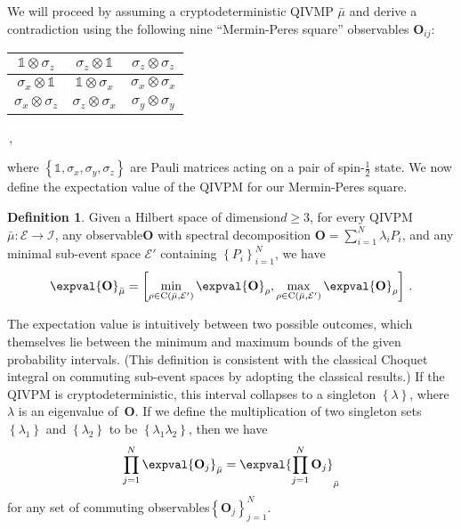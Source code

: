 \documentclass[english,reprint, aps, prl,superscriptaddress, showpacs,
showkeys, longbibliography, amsmath, amssymb]{revtex4-1}
\theoremstyle{plain}
\theoremstyle{definition}
\newtheorem{definition}[thm]{Definition}
\newcommand{\events}{\ensuremath{\mathcal{E}}}
\newcommand{\coreBorn}{\ensuremath{\mathrm{C}}}
\newcommand{\nb}{\nolinebreak[1] }
\begin{document}
We will proceed by assuming a cryptodeterministic QIVMP $\bar{\mu}$
and derive a contradiction using the following nine ``Mermin-Peres square''
observables $\mathbf{O}_{ij}$\nb\cite{Mermin1990Simple,peres1995quantum}:
\begin{center}
\begin{tabular}{|c|c|c|}
\hline 
$\mathbb{1}\otimes\sigma_{z}$  & $\sigma_{z}\otimes\mathbb{1}$  & $\sigma_{z}\otimes\sigma_{z}$ \tabularnewline
\hline 
$\sigma_{x}\otimes\mathbb{1}$  & $\mathbb{1}\otimes\sigma_{x}$  & $\sigma_{x}\otimes\sigma_{x}$ \tabularnewline
\hline 
$\sigma_{x}\otimes\sigma_{z}$  & $\sigma_{z}\otimes\sigma_{x}$  & $\sigma_{y}\otimes\sigma_{y}$ \tabularnewline
\hline 
\end{tabular}\,,
\par\end{center}

\noindent where $\left\{\mathbb{1},\sigma_{x},\sigma_{y},\sigma_{z}\right\}$ are
Pauli matrices acting on a pair of spin-$\frac{1}{2}$ state. We now define the
expectation value of the QIVPM for our Mermin-Peres square.

\begin{definition}Given a Hilbert space of dimension\nb$d\ge3$, for every
  QIVPM\nb$\bar{\mu}:\events\rightarrow\mathscr{I}$, any
  observable\nb$\mathbf{O}$ with spectral decomposition
  $\mathbf{O}=\sum_{i=1}^{N}\lambda_{i}P_{i}$, and any minimal
  sub-event space $\events'$ containing
  $\left\{ P_{i}\right\} _{i=1}^{N}$, we have
\begin{equation}
\expval{\mathbf{O}}_{\bar{\mu}}=\left[\min_{\rho\in\coreBorn\left(\bar{\mu},\events'\right)}\expval{\mathbf{O}}_{\rho},\max_{\rho\in\coreBorn\left(\bar{\mu},\events'\right)}\expval{\mathbf{O}}_{\rho}\right]\,.\label{eq:quantum-interval-expectation-core}
\end{equation}
\end{definition}

The expectation value is intuitively between two possible outcomes,
which themselves lie between the minimum and maximum bounds of the given
probability intervals. (This definition is consistent with the
classical Choquet integral on commuting sub-event spaces by adopting
the classical
results\nb\cite{GilboaSchmeidler1994,Grabisch2016}.)
If the QIVPM is cryptodeterministic, this interval collapses to a
singleton $\left\{ \lambda\right\} $, where $\lambda$ is an eigenvalue
of~$\mathbf{O}$. If we define the multiplication of two singleton
sets\nb$\left\{ \lambda_{1}\right\} $ and
$\left\{ \lambda_{2}\right\} $ to be
$\left\{ \lambda_{1}\lambda_{2}\right\} $, then we have
\begin{equation}
\prod_{j=1}^{N}\expval{\mathbf{O}_{j}}_{\bar{\mu}}=\expval{\prod_{j=1}^{N}\mathbf{O}_{j}}_{\bar{\mu}}\label{eq:Kochen-Specker-Rules}
\end{equation}
for any set of commuting observables\nb$\left\{ \mathbf{O}_{j}\right\}
_{j=1}^{N}$.
\end{document}
